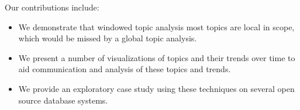 \documentclass[times, 10pt,twocolumn]{article}
\newcommand{\hla}[1]{{\color{changecolor2} #1 }}
\newcommand{\shrinkit}{\vspace*{-.3em}}
\begin{document}
\hla{
Our contributions include:
\begin{itemize}
\item We demonstrate that windowed topic analysis most topics are local
  in scope, which would be missed by a global topic analysis.
\item We present a number of visualizations of topics and their trends over time to aid
  communication and analysis of these topics and trends.
\item We provide an exploratory case study using these techniques on
  several open source database systems.
\end{itemize}
}


\end{document}
